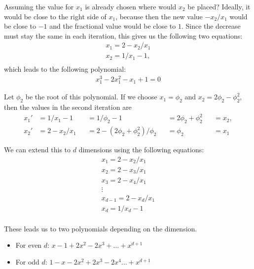 \documentclass[english,version-2020-11]{uzl-thesis}
\begin{document}
Assuming the value for $x_1$ is already chosen where would $x_2$ be placed?
Ideally, it would be close to the right side of $x_1$, because then the new
value $-x_2 / x_1$ would be close to $-1$ and the fractional value would be
close to $1$.
Since the decrease must stay the same in each iteration, this gives us the
following two equations:
\begin{align*}
  x_1 = 2 - x_2 / x_1 \\
  x_2 = 1 / x_1 - 1,\\
\end{align*}
which leads to the following polynomial:
\begin{align*}
  x_1^3 - 2x_1^2 - x_1 + 1 = 0
\end{align*}

Let $\phi_2$ be the root of this polynomial.
If we choose $x_1 = \phi_2$ and $x_2 = 2\phi_2 - \phi_2^2$,
then the values in the second iteration are
\[\begin{aligned}
  x_1' & = 1 / x_1 - 1   &  & = 1 / \phi_2 - 1                    &  & = 2\phi_2 + \phi_2^2 &  & = x_2, \\
  x_2' & = 2 - x_2 / x_1 &  & = 2 - (2\phi_2 + \phi_2^2) / \phi_2 &  & = \phi_2             &  & = x_1
\end{aligned}\]

We can extend this to $d$ dimensions using the following equations:
\begin{align*}
  x_1 = 2 - x_2 / x_1 \\
  x_2 = 2 - x_3 / x_1 \\
  x_3 = 2 - x_4 / x_1 \\
  \vdots \\
  x_{d-1} = 2 - x_d / x_1 \\
  x_d = 1 / x_d - 1 \\
\end{align*}

These leads us to two polynomials depending on the dimension.
\begin{itemize}
  \item For even $d$: $x - 1 + 2 x^2 - 2 x^3 + \dots + x^{d+1}$
  \item For odd $d$: $1 - x - 2 x^2 + 2 x^3 - 2 x^4 \dots + x^{d+1}$
\end{itemize}

\end{document}
